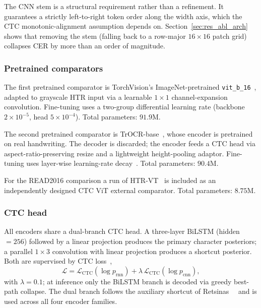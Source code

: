 The CNN stem is a structural requirement rather than a refinement. It guarantees a strictly left-to-right token order along the width axis, which the CTC monotonic-alignment assumption depends on. Section~\ref{sec:res_abl_arch} shows that removing the stem (falling back to a row-major $16 \times 16$ patch grid) collapses CER by more than an order of magnitude.

\subsubsection{Pretrained comparators}

The first pretrained comparator is TorchVision's ImageNet-pretrained \texttt{vit\_b\_16}~\cite{dosovitskiy2021vit}, adapted to grayscale HTR input via a learnable $1{\times}1$ channel-expansion convolution. Fine-tuning uses a two-group differential learning rate (backbone $2 \times 10^{-5}$, head $5 \times 10^{-4}$). Total parameters: $91.9$M.

The second pretrained comparator is TrOCR-base~\cite{li2023trocr}, whose encoder is pretrained on real handwriting. The decoder is discarded; the encoder feeds a CTC head via aspect-ratio-preserving resize and a lightweight height-pooling adaptor. Fine-tuning uses layer-wise learning-rate decay~\cite{howard2018ulmfit}. Total parameters: $90.4$M.

For the READ2016 comparison a run of HTR-VT~\cite{li2024htrvt} is included as an independently designed CTC ViT external comparator. Total parameters: $8.75$M.

\subsubsection{CTC head}
\label{sec:heads}

All encoders share a dual-branch CTC head. A three-layer BiLSTM (hidden $= 256$) followed by a linear projection produces the primary character posteriors; a parallel $1{\times}3$ convolution with linear projection produces a shortcut posterior. Both are supervised by CTC loss~\cite{graves2006ctc},
\begin{equation}
\label{eq:ctc_loss}
\mathcal{L} = \mathcal{L}_{\mathrm{CTC}}(\log p_{\mathrm{rnn}}) + \lambda \, \mathcal{L}_{\mathrm{CTC}}(\log p_{\mathrm{cnn}}),
\end{equation}
with $\lambda = 0.1$; at inference only the BiLSTM branch is decoded via greedy best-path collapse. The dual branch follows the auxiliary shortcut of Retsinas~\etal~\cite{retsinas2022htrbestpractices} and is used across all four encoder families.

